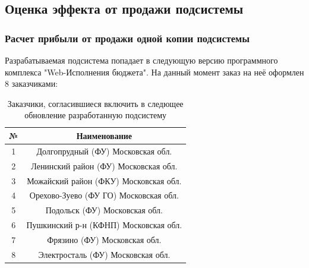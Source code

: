 \documentclass[a4paper]{extarticle}
\numberwithin{equation}{section}
\begin{document}
\subsection{Оценка эффекта от продажи подсистемы}

\subsubsection{Расчет прибыли от продажи одной копии подсистемы}
Разрабатываемая подсистема попадает в следующую версию программного комплекса "Web-Исполнения бюджета". На данный момент заказ на неё оформлен 8 заказчиками:\par
\begin{table}[H]
\caption{Заказчики, согласившиеся включить в следющее обновление разработанную подсистему}
  \begin{tabular}{|c|c|}
  \hline
  № & Наименование \\\hline
  1 & Долгопрудный (ФУ) Московская обл. \\\hline
  2 & Ленинский район (ФУ) Московская обл. \\\hline
  3 & Можайский район (ФКУ) Московская обл. \\\hline
  4 & Орехово-Зуево (ФУ ГО) Московская обл. \\\hline
  5 & Подольск (ФУ) Московская обл. \\\hline
  6 & Пушкинский р-н (КФНП) Московская обл. \\\hline
  7 & Фрязино (ФУ) Московская обл. \\\hline
  8 & Электросталь (ФУ) Московская обл. \\\hline
  \end{tabular}
\end{table}\par
\end{document}

